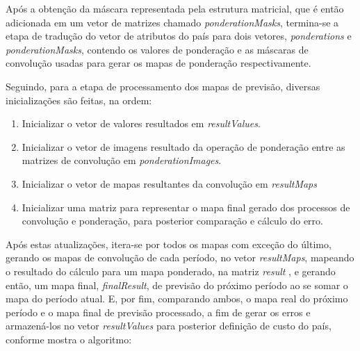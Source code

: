 Após a obtenção da máscara representada pela estrutura matricial, que é então adicionada em um vetor de matrizes chamado \emph{ponderationMasks}, termina-se a etapa de tradução do vetor de atributos do país para dois vetores, \emph{ponderations} e \emph{ponderationMasks}, contendo os valores de ponderação e as máscaras de convolução usadas para gerar os mapas de ponderação respectivamente.

Seguindo, para a etapa de processamento dos mapas de previsão, diversas inicializações são feitas, na ordem:
\begin{enumerate}
\item Inicializar o vetor de valores resultados em \emph{resultValues}.
\item Inicializar o vetor de imagens resultado da operação de ponderação entre as matrizes de convolução em \emph{ponderationImages}.
\item Inicializar o vetor de mapas resultantes da convolução em \emph{resultMaps}
\item Inicializar uma matriz para representar o mapa final gerado dos processos de convolução e ponderação, para posterior comparação e cálculo do erro.
\end{enumerate}



Após estas atualizações, itera-se por todos os mapas com exceção do último, gerando os mapas de convolução de cada período, no vetor \emph{resultMaps}, mapeando o resultado do cálculo para um mapa ponderado, na matriz \emph{result} , e gerando então, um mapa final, \emph{finalResult}, de previsão do próximo período ao se somar o mapa do período atual. E, por fim, comparando  ambos, o mapa real do próximo período e o mapa final de previsão processado, a fim de gerar os erros e armazená-los no vetor \emph{resultValues} para posterior definição de custo do país, conforme mostra o algoritmo:

